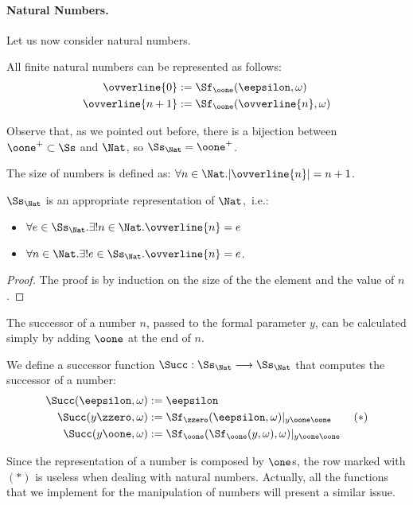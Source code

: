 \paragraph{Natural Numbers.}
Let us now consider natural numbers.
\begin{defn}
All finite natural numbers can be represented
as follows:
\begin{align*}
{\ovverline{0}} &:= \Sf_\oone(\eepsilon,\omega) \\
{\ovverline{n+1}}&:= \Sf_\oone(
{\ovverline{n}},
\omega)
\end{align*}
\end{defn}
%
%
\noindent
Observe that, as we pointed out before,
there is a bijection between $\oone^+\subset \Ss$
and $\Nat$, so $\Ss_\Nat=\oone^+$.

\begin{remark}\label{remark:sizeNumber}
The size of numbers is defined as: $\forall n\in \Nat.|
{\ovverline{n}}|=n+1$.
\end{remark}

\begin{prop}
$\Ss_\Nat$ is an appropriate representation of
$\Nat$,~i.e.:
\begin{itemize}
\itemsep0em
\item $\forall e\in \Ss_\Nat.\exists ! n\in \Nat.
{\ovverline{n}}
=e$
\item $\forall n\in \Nat.\exists !e\in \Ss_\Nat.
{\ovverline{n}}
=e$.
\end{itemize}
\end{prop}
\begin{proof}
The proof is by induction on the size
of the the element and the value of $n$.
\end{proof}
%
%
The successor of a number $n$, passed
to the formal parameter $y$,
can be calculated simply by adding $\oone$
at the end of $n$.


\begin{defn}[Successor]
We define a successor function
{$\Succ : \Ss_\Nat \longrightarrow \Ss_\Nat$}
that computes the successor of a number:
\begin{align*}
\Succ(\eepsilon, \omega) &:= \eepsilon \\
\Succ(y\zzero, \omega) &:= \Sf_\zzero(\eepsilon,\omega)|_{y\oone\oone} \ \ \ \ \ \ {(*)} \\
\Succ(y\oone,\omega) &:= {\Sf_\oone(\Sf_\oone(y,\omega)},\omega)|_{y\oone\oone}
\end{align*}
\end{defn}
\noindent
Since the representation of a number
is composed by $\one$s,
the row marked with {$(*)$}
is useless when dealing with natural numbers.
Actually, all the functions that we
implement for the manipulation of numbers
will present a similar issue.



